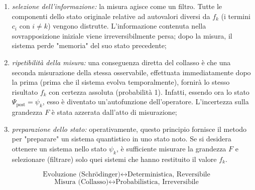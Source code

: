 \documentclass[a4paper,11pt]{report}
\begin{document}
\begin{enumerate}
    \item \textit{selezione dell'informazione:}
    la misura agisce come un filtro. Tutte le componenti dello stato originale relative ad autovalori diversi da $f_k$ (i termini $c_i$ con $i \neq k$) vengono distrutte. L'informazione contenuta nella sovrapposizione iniziale viene irreversibilmente persa; dopo la misura, il sistema perde "memoria" del suo stato precedente;

    \item \textit{ripetibilità della misura:}
    una conseguenza diretta del collasso è che una seconda misurazione della stessa osservabile, effettuata immediatamente dopo la prima (prima che il sistema evolva temporalmente), fornirà lo stesso risultato $f_k$ con certezza assoluta (probabilità 1).
    Infatti, essendo ora lo stato $\Psi_{\text{post}} = \psi_k$, esso è diventato un'autofunzione dell'operatore. L'incertezza sulla grandezza $F$ è stata azzerata dall'atto di misurazione;

    \item \textit{preparazione dello stato:}
    operativamente, questo principio fornisce il metodo per "preparare" un sistema quantistico in uno stato noto. Se si desidera ottenere un sistema nello stato $\psi_k$, è sufficiente misurare la grandezza $F$ e selezionare (filtrare) solo quei sistemi che hanno restituito il valore $f_k$.
\end{enumerate}

\begin{equation}
    \text{Evoluzione (Schrödinger)} \leftrightarrow \text{Deterministica, Reversibile}
\end{equation}
\begin{equation}
    \text{Misura (Collasso)} \leftrightarrow \text{Probabilistica, Irreversibile}
\end{equation}
\end{document}
